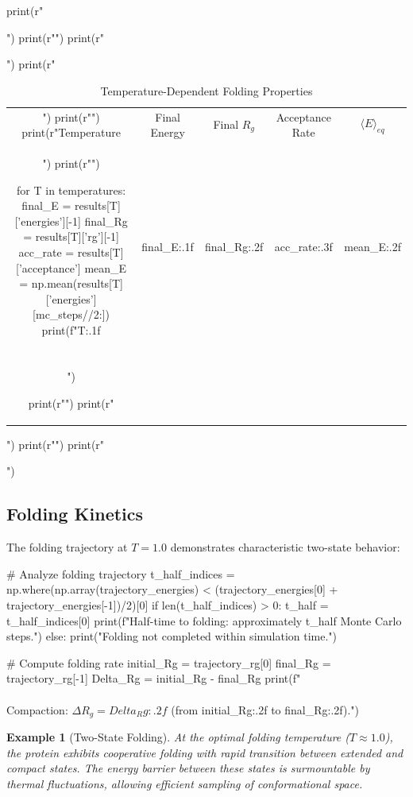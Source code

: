 \documentclass[a4paper, 11pt]{article}
\newtheorem{example}{Example}[section]
\begin{document}
\begin{pycode}
print(r"\begin{table}[htbp]")
print(r"\centering")
print(r"\caption{Temperature-Dependent Folding Properties}")
print(r"\begin{tabular}{ccccc}")
print(r"\toprule")
print(r"Temperature & Final Energy & Final $R_g$ & Acceptance Rate & $\langle E \rangle_{eq}$ \\")
print(r"\midrule")

for T in temperatures:
    final_E = results[T]['energies'][-1]
    final_Rg = results[T]['rg'][-1]
    acc_rate = results[T]['acceptance']
    mean_E = np.mean(results[T]['energies'][mc_steps//2:])
    print(f"{T:.1f} & {final_E:.1f} & {final_Rg:.2f} & {acc_rate:.3f} & {mean_E:.2f} \\\\")

print(r"\bottomrule")
print(r"\end{tabular}")
print(r"\label{tab:thermodynamics}")
print(r"\end{table}")
\end{pycode}

\subsection{Folding Kinetics}

The folding trajectory at $T = 1.0$ demonstrates characteristic two-state behavior:

\begin{pycode}
# Analyze folding trajectory
t_half_indices = np.where(np.array(trajectory_energies) < (trajectory_energies[0] + trajectory_energies[-1])/2)[0]
if len(t_half_indices) > 0:
    t_half = t_half_indices[0]
    print(f"Half-time to folding: approximately {t_half} Monte Carlo steps.")
else:
    print("Folding not completed within simulation time.")

# Compute folding rate
initial_Rg = trajectory_rg[0]
final_Rg = trajectory_rg[-1]
Delta_Rg = initial_Rg - final_Rg
print(f"\\\\Compaction: $\Delta R_g = {Delta_Rg:.2f}$ (from {initial_Rg:.2f} to {final_Rg:.2f}).")
\end{pycode}

\begin{example}[Two-State Folding]
At the optimal folding temperature ($T \approx 1.0$), the protein exhibits cooperative
folding with rapid transition between extended and compact states. The energy barrier
between these states is surmountable by thermal fluctuations, allowing efficient sampling
of conformational space.
\end{example}
\end{document}
